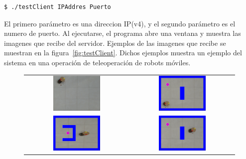 \documentclass[12pt,letterpaper,notitlepage]{report}
\newlength{\spacing} \setlength{\spacing}{\baselineskip}
\newcommand{\nspace}[1]{\setlength{\baselineskip}{#1\spacing}}
\newenvironment{linespacing}[1]{\nspace{#1}}{}
\begin{document}
{\begin{linespacing}{1.5}
  {\small
\begin{verbatim} 
$ ./testClient IPAddres Puerto
\end{verbatim} }

El primero parámetro es una direccion IP(v4), y el segundo parámetro es el numero de puerto. Al ejecutarse, el programa abre una ventana y muestra las imagenes que recibe del servidor. Ejemplos de las imagenes que recibe se muestran en la figura~\ref{fig:testClient}. Dichos ejemplos muestra un ejemplo del sistema en una operación de teleoperación de robots móviles. 

\begin{figure}[htbp!]
  \centering
  \begin{tabular}{cc}
    \includegraphics[width=0.47\textwidth]{imagenes/outImage_00121_A.png}&
    \includegraphics[width=0.47\textwidth]{imagenes/outImage_00151.png}\\
    \includegraphics[width=0.47\textwidth]{imagenes/outImage_00766.png}&
    \includegraphics[width=0.47\textwidth]{imagenes/outImage_00796.png}\\

\end{tabular}
\end{figure}
\end{linespacing}}
\end{document}
